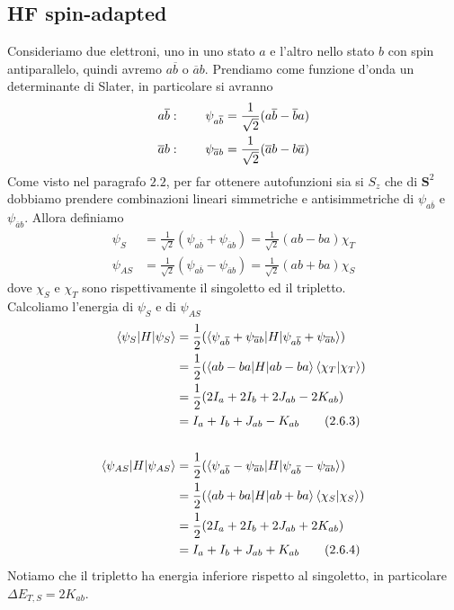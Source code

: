 \documentclass{article}
\begin{document}
\subsection{HF spin-adapted}
Consideriamo due elettroni, uno in uno stato $a$ e l'altro nello stato $b$ con spin antiparallelo, quindi avremo $a\overline{b}$ o $\overline{a}b$. Prendiamo come funzione d'onda un determinante di Slater, in particolare si avranno 
\begin{align}
    a\overline{b}&: \qquad \psi_{a\overline{b}} = \frac{1}{\sqrt{2}}(a\overline{b} - \overline{b}a) \notag \\
    \overline{a}b&: \qquad \psi_{\overline{a}b} = \frac{1}{\sqrt{2}}(\overline{a}b - b\overline{a}) \notag
\end{align}
Come visto nel paragrafo $2.2$, per far ottenere autofunzioni sia si $S_z$ che di $\mathbf{S}^2$ dobbiamo prendere combinazioni lineari simmetriche e antisimmetriche di $\psi_{a\overline{b}}$ e $\psi_{\overline{a}b}$. Allora definiamo 
\begin{align}
    \psi_S &= \frac{1}{\sqrt{2}}(\psi_{a\overline{b}} + \psi_{\overline{a}b}) = \frac{1}{\sqrt{2}}(ab - ba)\chi_T \tag{2.6.1} \\
    \psi_{AS} &= \frac{1}{\sqrt{2}}(\psi_{a\overline{b}} - \psi_{\overline{a}b}) = \frac{1}{\sqrt{2}}(ab + ba)\chi_S \tag{2.6.2}
\end{align}
dove $\chi_S$ e $\chi_T$ sono rispettivamente il singoletto ed il tripletto. \\
Calcoliamo l'energia di $\psi_S$ e di $\psi_{AS}$
\begin{align}
    \braket{\psi_S|H|\psi_S} &= \frac{1}{2}(\braket{\psi_{a\overline{b}} + \psi_{\overline{a}b}|H|\psi_{a\overline{b}} + \psi_{\overline{a}b}}) \notag \\
    &= \frac{1}{2}(\braket{ab - ba|H|ab - ba}\braket{\chi_T|\chi_T}) \notag \\
    &= \frac{1}{2}(2I_a + 2I_b + 2J_{ab} - 2K_{ab}) \notag \\
    &= I_a + I_b + J_{ab} - K_{ab} \tag{2.6.3} \\ \notag \\
    \braket{\psi_{AS}|H|\psi_{AS}} &= \frac{1}{2}(\braket{\psi_{a\overline{b}} - \psi_{\overline{a}b}|H|\psi_{a\overline{b}} - \psi_{\overline{a}b}}) \notag \\
    &= \frac{1}{2}(\braket{ab + ba|H|ab + ba}\braket{\chi_S|\chi_S}) \notag \\
    &= \frac{1}{2}(2I_a + 2I_b + 2J_{ab} + 2K_{ab}) \notag \\
    &= I_a + I_b + J_{ab} + K_{ab} \tag{2.6.4}
\end{align}
Notiamo che il tripletto ha energia inferiore rispetto al singoletto, in particolare $\Delta E_{T, S} = 2K_{ab}$.
\end{document}
